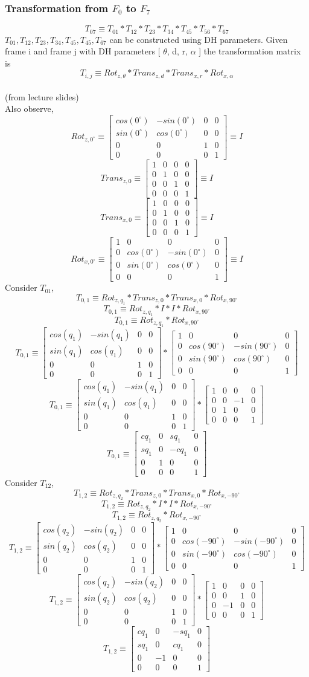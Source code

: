 \documentclass[12pt]{article}
\newcommand{\fromlectures}{{\\ \color{blue} \hspace*{\fill}(from lecture slides)} \\}
\newcommand{\rx}[1]{\begin{bmatrix} 1 & 0 & 0 & 0 \\ 0 & cos(#1) & -sin(#1) & 0 \\ 0 & sin(#1) & cos(#1) & 0 \\ 0 & 0 & 0 & 1 \end{bmatrix}}
\newcommand{\rz}[1]{\begin{bmatrix} cos(#1) & -sin(#1) & 0 & 0 \\ sin(#1) & cos(#1) & 0 & 0 \\ 0 & 0 & 1 & 0 \\ 0 & 0 & 0 & 1 \end{bmatrix}}
\newcommand{\trans}[3]{\begin{bmatrix} 1 & 0 & 0 & #1 \\ 0 & 1 & 0 & #2 \\ 0 & 0 & 1 & #3 \\ 0 & 0 & 0 & 1 \end{bmatrix}}
\begin{document}
\subsubsection*{Transformation from $F_0$ to $F_7$}
\[
  T_{07} \equiv
  T_{01}
  * T_{12}
  * T_{23}
  * T_{34}
  * T_{45}
  * T_{56}
  * T_{67}
\]
$T_{01}, T_{12}, T_{23}, T_{34}, T_{45}, T_{45}, T_{67}$ can be constructed using DH parameters.
Given frame i and frame j with DH parameters [ $\theta$, d, r, $\alpha$ ] the transformation matrix is
\[
  T_{i,j} \equiv Rot_{z,\theta} * Trans_{z, d} * Trans_{x, r} * Rot_{x, \alpha}
\]
\fromlectures
Also observe,
\[
  Rot_{z, 0^{\circ}} \equiv \rz{0^{\circ}} \equiv I
\]
\[
  Trans_{z, 0} \equiv \trans{0}{0}{0} \equiv I
\]
\[
  Trans_{x, 0} \equiv \trans{0}{0}{0} \equiv I
\]
\[
  Rot_{x, 0^{\circ}} \equiv \rx{0^{\circ}} \equiv I
\]
Consider $T_{01}$,
\[
  T_{0,1} \equiv Rot_{z,q_1} * Trans_{z, 0} * Trans_{x, 0} * Rot_{x, 90^{\circ}}
\]
\[
  T_{0,1} \equiv Rot_{z,q_1} * I * I * Rot_{x, 90^{\circ}}
\]
\[
  T_{0,1} \equiv Rot_{z,q_1} * Rot_{x, 90^{\circ}}
\]
\[
  T_{0,1} \equiv \rz{q_1} * \rx{90^{\circ}}
\]
\[
  T_{0,1} \equiv
  \rz{q_1}
  *
  \begin{bmatrix} 1 & 0 & 0 & 0 \\ 0 & 0 & -1 & 0 \\ 0 & 1 & 0 & 0 \\ 0 & 0 & 0 & 1 \end{bmatrix}
\]
\[
  T_{0,1} \equiv
  \begin{bmatrix} cq_1 & 0 & sq_1 & 0 \\ sq_1 & 0 & -cq_1 & 0 \\ 0 & 1 & 0 & 0 \\ 0 & 0 & 0 & 1 \end{bmatrix}
\]
Consider $T_{12}$,
\[
  T_{1,2} \equiv Rot_{z,q_2} * Trans_{z, 0} * Trans_{x, 0} * Rot_{x, -90^{\circ}}
\]
\[
  T_{1,2} \equiv Rot_{z,q_2} * I * I * Rot_{x, -90^{\circ}}
\]
\[
  T_{1,2} \equiv Rot_{z,q_2} * Rot_{x, -90^{\circ}}
\]
\[
  T_{1,2} \equiv \rz{q_2} * \rx{-90^{\circ}}
\]
\[
  T_{1,2} \equiv
  \rz{q_2}
  *
  \begin{bmatrix} 1 & 0 & 0 & 0 \\ 0 & 0 & 1 & 0 \\ 0 & -1 & 0 & 0 \\ 0 & 0 & 0 & 1 \end{bmatrix}
\]
\[
  T_{1,2} \equiv
  \begin{bmatrix} cq_1 & 0 & -sq_1 & 0 \\ sq_1 & 0 & cq_1 & 0 \\ 0 & -1 & 0 & 0 \\ 0 & 0 & 0 & 1 \end{bmatrix}
\]
\end{document}
